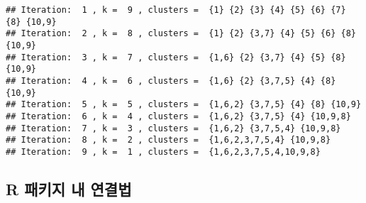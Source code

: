 \documentclass[]{book}
\newenvironment{Shaded}{\begin{snugshade}}{\end{snugshade}}
\newcommand{\CommentTok}[1]{\textcolor[rgb]{0.56,0.35,0.01}{\textit{#1}}}
\newcommand{\ControlFlowTok}[1]{\textcolor[rgb]{0.13,0.29,0.53}{\textbf{#1}}}
\newcommand{\DataTypeTok}[1]{\textcolor[rgb]{0.13,0.29,0.53}{#1}}
\newcommand{\DecValTok}[1]{\textcolor[rgb]{0.00,0.00,0.81}{#1}}
\newcommand{\KeywordTok}[1]{\textcolor[rgb]{0.13,0.29,0.53}{\textbf{#1}}}
\newcommand{\NormalTok}[1]{#1}
\newcommand{\OperatorTok}[1]{\textcolor[rgb]{0.81,0.36,0.00}{\textbf{#1}}}
\newcommand{\StringTok}[1]{\textcolor[rgb]{0.31,0.60,0.02}{#1}}
\begin{document}
\begin{Shaded}
\end{Shaded}

\begin{verbatim}
## Iteration:  1 , k =  9 , clusters =  {1} {2} {3} {4} {5} {6} {7} {8} {10,9} 
## Iteration:  2 , k =  8 , clusters =  {1} {2} {3,7} {4} {5} {6} {8} {10,9} 
## Iteration:  3 , k =  7 , clusters =  {1,6} {2} {3,7} {4} {5} {8} {10,9} 
## Iteration:  4 , k =  6 , clusters =  {1,6} {2} {3,7,5} {4} {8} {10,9} 
## Iteration:  5 , k =  5 , clusters =  {1,6,2} {3,7,5} {4} {8} {10,9} 
## Iteration:  6 , k =  4 , clusters =  {1,6,2} {3,7,5} {4} {10,9,8} 
## Iteration:  7 , k =  3 , clusters =  {1,6,2} {3,7,5,4} {10,9,8} 
## Iteration:  8 , k =  2 , clusters =  {1,6,2,3,7,5,4} {10,9,8} 
## Iteration:  9 , k =  1 , clusters =  {1,6,2,3,7,5,4,10,9,8}
\end{verbatim}

\hypertarget{hclust}{%
\subsection{R 패키지 내 연결법}\label{hclust}}
\end{document}
